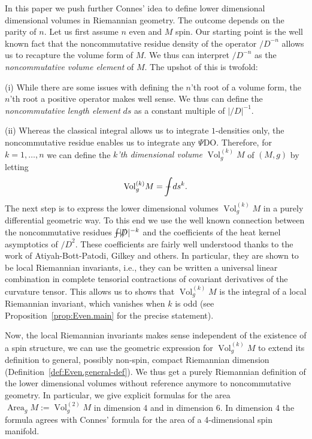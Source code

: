 \documentclass[leqno, 10pt]{amsart}
\theoremstyle{remark}
\begin{document}
In this paper we push further Connes' idea to define lower dimensional dimensional volumes in Riemannian geometry. The outcome 
depends on the parity of $n$. Let us first assume $n$ even and $M$ spin. Our starting point is the well known fact that the 
noncommutative residue density of the operator ${\ensuremath{{/\!\!\!\!D}}}^{-n}$ allows us to recapture the volume form of $M$. We thus can interpret ${\ensuremath{{/\!\!\!\!D}}}^{-n}$ as the 
 \emph{noncommutative volume element} of $M$. The upshot of this is twofold:\smallskip  

(i) While there are some issues with defining the $n$'th root of a volume form, the $n$'th root a positive operator makes well sense. We thus 
can define the  \emph{noncommutative length element} $ds$ as a constant multiple of $|{\ensuremath{{/\!\!\!\!D}}}|^{-1}$.\smallskip  

(ii) Whereas the classical integral allows us to integrate $1$-densities only,  the noncommutative residue enables us to 
integrate any {$\Psi$DO}. Therefore, for $k=1,\ldots,n$ we can define the \emph{$k$'th dimensional volume}  $ {{\operatorname{{Vol}}}}^{(k)}_{g}M$ of $(M,g)$ by letting 
\[
 {{\operatorname{{Vol}}}}^{(k)}_{g}M={\ensuremath{-\hspace{-2,4ex}\int}} ds^{k}.
\]
\indent The next step is to express the lower dimensional volumes $ {{\operatorname{{Vol}}}}^{(k)}_{g}M$ in a purely differential geometric way. 
To this end we use the well known connection between the noncommutative 
residues ${\ensuremath{-\hspace{-2,4ex}\int}} |{\ensuremath{{/\!\!\!\!D}}}|^{-k}$ and the coefficients of the heat kernel asymptotics of ${\ensuremath{{/\!\!\!\!D}}}^{2}$. These coefficients are fairly well 
understood thanks to the work of Atiyah-Bott-Patodi, Gilkey and others. In particular, they are shown to be local Riemannian 
invariants, i.e., they can be written a universal linear combination in complete tensorial contractions of covariant derivatives of the curvature 
tensor. This allows us to shows that ${{\operatorname{{Vol}}}}^{(k)}_{g}M$ is the integral of a local Riemannian invariant, which vanishes when $k$ is odd 
(see Proposition~\ref{prop:Even.main} for the precise statement).

Now, the local Riemannian invariants makes sense independent of the existence of a spin structure, we can use the geometric expression for 
${{\operatorname{{Vol}}}}^{(k)}_{g}M$ to extend its definition to general, possibly non-spin, compact Riemannian dimension (Definition~\ref{def:Even.general-def}). 
We thus get a purely Riemannian definition of the lower dimensional volumes without 
reference anymore to noncommutative geometry. In particular, we give explicit formulas for the area ${\operatorname{{Area}}}_{g}M:={{\operatorname{{Vol}}}}_{g}^{(2)}M$ 
in dimension 4 and in dimension 6. In dimension 4 the formula agrees with Connes' formula for the area of a 4-dimensional spin manifold. 
\end{document}
